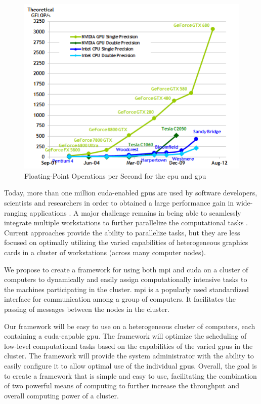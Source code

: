 \begin{figure}[htb]
\centering
\includegraphics[scale=0.75]{img/floatingPoint.png}
\caption{Floating-Point Operations per Second for the \gls{cpu} and
         \gls{gpu} \cite{website:cudaCProgrammingGuide}}
\end{figure}

Today, more than one million \gls{cuda}-enabled \glspl{gpu} are used by
software developers, scientists and researchers in order to obtained a large
performance gain in wide-ranging applications
\cite{website:cudaCProgrammingGuide}. A major challenge remains in being
able to seamlessly integrate multiple workstations to further parallelize the
computational tasks \cite{hadri2010identifying} \cite{hindman2009common}.
Current approaches provide the ability to parallelize tasks, but they are less
focused on optimally utilizing the varied capabilities of heterogeneous
graphics cards in a cluster of workstations (across many computer nodes).

We propose to create a framework for using both \Gls{mpi} and \gls{cuda} on a
cluster of computers to dynamically and easily assign computationally intensive
tasks to the machines participating in the cluster.  \Gls{mpi} is a popularly
used standardized interface for communication among a group of computers. It
facilitates the passing of messages between the nodes in the cluster.

Our framework will be easy to use on a heterogeneous cluster of computers, each
containing a \Gls{cuda}-capable \gls{gpu}\@. The framework will optimize the
scheduling of low-level computational tasks based on the capabilities of the
varied \glspl{gpu} in the cluster. The framework will provide the system
administrator with the ability to easily configure it to allow optimal use of
the individual \glspl{gpu}. Overall, the goal is to create a framework that is
simple and easy to use, facilitating the combination of two powerful means of
computing to further increase the throughput and overall computing power of a
cluster.

